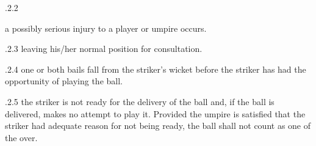 \documentclass[12pt]{article}
\begin{document}
\vspace{\baselineskip}

\vspace{\baselineskip}

\vspace{\baselineskip}
\begin{Center}
{\fontsize{8pt}{9.6pt}\par}
\end{Center}\par


\vspace{\baselineskip}
\begin{adjustwidth}{0.49in}{0.0in}
{\fontsize{9pt}{10.8pt}.2.2 \tabto{1.17in} {\fontsize{8pt}{9.6pt}\selectfont a possibly serious injury to a player or umpire occurs.\par}\par}\par

\end{adjustwidth}


\vspace{\baselineskip}
\begin{adjustwidth}{0.49in}{0.0in}
{\fontsize{9pt}{10.8pt}.2.3 \tabto{1.17in} leaving his/her normal position for consultation.\par}\par

\end{adjustwidth}


\vspace{\baselineskip}
\begin{adjustwidth}{1.18in}{0.4in}
{\fontsize{9pt}{10.8pt}.2.4 \tabto{1.17in} one or both bails fall from the striker’s wicket before the striker has had the opportunity of playing the ball.\par}\par

\end{adjustwidth}


\vspace{\baselineskip}
\begin{adjustwidth}{1.18in}{0.11in}
{\fontsize{9pt}{10.8pt}.2.5 \tabto{1.17in} the striker is not ready for the delivery of the ball and, if the ball is delivered, makes no attempt to play it. Provided the umpire is satisfied that the striker had adequate reason for not being ready, the ball shall not count as one of the over.\par}\par

\end{adjustwidth}
\end{document}
